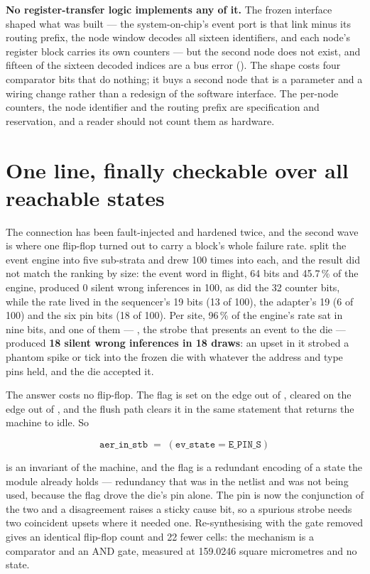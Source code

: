 \textbf{No register-transfer logic implements any of it.} The frozen
interface shaped what was built --- the system-on-chip's event port is
that link minus its routing prefix, the node window decodes all sixteen
identifiers, and each node's register block carries its own counters
--- but the second node does not exist, and fifteen of the sixteen
decoded indices are a bus error (). The shape
costs four comparator bits that do nothing; it buys a second node that
is a parameter and a wiring change rather than a redesign of the
software interface. The per-node counters, the node identifier and the
routing prefix are specification and reservation, and a reader should
not count them as hardware.


\section{One line, finally checkable over all reachable states}

The connection has been fault-injected and hardened twice, and the
second wave is where one flip-flop turned out to carry a block's whole
failure rate.  split the event engine into five sub-strata
and drew 100 times into each, and the result did not match the ranking
by size: the event word in flight, 64 bits and 45.7\,\% of the engine,
produced 0 silent wrong inferences in 100, as did the 32 counter bits,
while the rate lived in the sequencer's 19 bits (13 of 100), the
adapter's 19 (6 of 100) and the six pin bits (18 of 100). Per site,
96\,\% of the engine's rate sat in nine bits, and one of them ---
, the strobe that presents an event to the die ---
produced \textbf{18 silent wrong inferences in 18 draws}: an upset in
it strobed a phantom spike or tick into the frozen die with whatever
the address and type pins held, and the die accepted it.

The answer costs no flip-flop. The flag is set on the edge out of
, cleared on the edge out of , and the
flush path clears it in the same statement that returns the machine to
idle. So

\begin{equation}
\mathtt{aer\_in\_stb} \;=\; (\mathtt{ev\_state} = \mathtt{E\_PIN\_S})
\label{eq:h5}
\end{equation}

is an invariant of the machine, and the flag is a redundant encoding of
a state the module already holds --- redundancy that was in the netlist
and was not being used, because the flag drove the die's pin alone. The
pin is now the conjunction of the two and a disagreement raises a
sticky cause bit, so a spurious strobe needs two coincident upsets
where it needed one. Re-synthesising with the gate removed gives an
identical flip-flop count and 22 fewer cells: the mechanism is a
comparator and an AND gate, measured at 159.0246 square micrometres and
no state.


